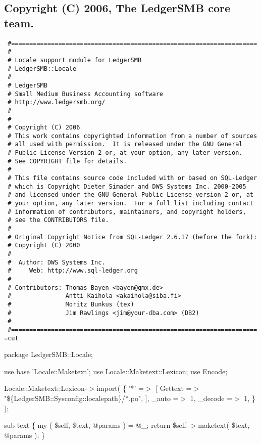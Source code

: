 \begin{description}
\begin{description}
\begin{description}
\begin{description}
\begin{description}
\begin{description}
\end{description}
\subsection*{Copyright (C) 2006, The LedgerSMB core team.\label{LedgerSMB::Locale_Copyright_C_2006_The_LedgerSMB_core_team_}}
\begin{verbatim}
 #====================================================================
 #
 # Locale support module for LedgerSMB
 # LedgerSMB::Locale
 #
 # LedgerSMB
 # Small Medium Business Accounting software
 # http://www.ledgersmb.org/
 #
 #
 # Copyright (C) 2006
 # This work contains copyrighted information from a number of sources
 # all used with permission.  It is released under the GNU General 
 # Public License Version 2 or, at your option, any later version.
 # See COPYRIGHT file for details.
 #
 # This file contains source code included with or based on SQL-Ledger
 # which is Copyright Dieter Simader and DWS Systems Inc. 2000-2005
 # and licensed under the GNU General Public License version 2 or, at
 # your option, any later version.  For a full list including contact
 # information of contributors, maintainers, and copyright holders,
 # see the CONTRIBUTORS file.
 #
 # Original Copyright Notice from SQL-Ledger 2.6.17 (before the fork):
 # Copyright (C) 2000
 #
 #  Author: DWS Systems Inc.
 #     Web: http://www.sql-ledger.org
 #
 # Contributors: Thomas Bayen <bayen@gmx.de>
 #               Antti Kaihola <akaihola@siba.fi>
 #               Moritz Bunkus (tex)
 #               Jim Rawlings <jim@your-dba.com> (DB2)
 #
 #====================================================================
=cut
\end{verbatim}


package LedgerSMB::Locale;



use base 'Locale::Maketext';
use Locale::Maketext::Lexicon;
use Encode;



Locale::Maketext::Lexicon-$>$import(
    \{
        '*'     =$>$ [ Gettext =$>$ "\$\{LedgerSMB::Sysconfig::localepath\}/*.po", ],
        \_auto   =$>$ 1,
        \_decode =$>$ 1,
    \}
);



sub text \{
    my ( \$self, \$text, @params ) = @\_;
    return \$self-$>$maketext( \$text, @params );
\}




\end{description}
\end{description}
\end{description}
\end{description}
\end{description}
